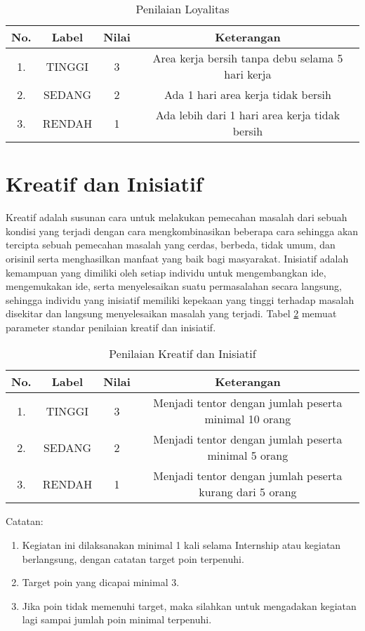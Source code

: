 \begin{table}[H]
\caption{Penilaian Loyalitas}
\centering
\begin{tabular}{|c|c|c|c|}
\hline
\textbf{No.}&\textbf{Label}&\textbf{Nilai}&\textbf{Keterangan}\\
\hline
1.&TINGGI&3&Area kerja bersih tanpa debu selama 5 hari kerja\\
\hline
2.&SEDANG&2&Ada 1 hari area kerja tidak bersih\\
\hline
3.&RENDAH&1&Ada lebih dari 1 hari area kerja tidak bersih\\
\hline
\end{tabular}
\label{table:nilailoyalitas}
\end{table}

\section{Kreatif dan Inisiatif}
Kreatif adalah susunan cara untuk melakukan pemecahan masalah dari sebuah kondisi yang terjadi dengan cara mengkombinasikan beberapa cara sehingga akan tercipta sebuah pemecahan masalah yang cerdas, berbeda, tidak umum, dan orisinil serta menghasilkan manfaat yang baik bagi masyarakat. Inisiatif adalah kemampuan yang dimiliki oleh setiap individu untuk mengembangkan ide, mengemukakan ide, serta menyelesaikan suatu permasalahan secara langsung, sehingga individu yang inisiatif memiliki kepekaan yang tinggi terhadap masalah disekitar dan langsung menyelesaikan masalah yang terjadi. Tabel \ref{table:nilaikreatifinisiatif} memuat parameter standar penilaian kreatif dan inisiatif.

\begin{table}[H]
\caption{Penilaian Kreatif dan Inisiatif}
\centering
\begin{tabular}{|c|c|c|c|}
\hline
\textbf{No.}&\textbf{Label}&\textbf{Nilai}&\textbf{Keterangan}\\
\hline
1.&TINGGI&3&Menjadi tentor dengan jumlah peserta minimal 10 orang\\
\hline
2.&SEDANG&2&Menjadi tentor dengan jumlah peserta minimal 5 orang\\
\hline
3.&RENDAH&1&Menjadi tentor dengan jumlah peserta kurang dari 5 orang\\
\hline
\end{tabular}
\label{table:nilaikreatifinisiatif}
\end{table}

Catatan:
\begin{enumerate}
\item Kegiatan ini dilaksanakan minimal 1 kali selama Internship atau kegiatan berlangsung, dengan catatan target poin terpenuhi.
\item Target poin yang dicapai minimal 3.
\item Jika poin tidak memenuhi target, maka silahkan untuk mengadakan kegiatan lagi sampai jumlah poin minimal terpenuhi.
\end{enumerate} 